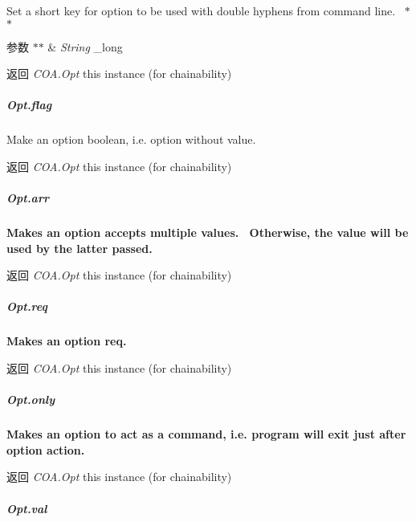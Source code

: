Set a short key for option to be used with double hyphens from command line.~\newline
 $\ast$$\ast$
\begin{DoxyParams}{参数}
{\em $\ast$$\ast$} & {\itshape String} {\ttfamily \+\_\+long}~\newline
 {\bfseries }\\
\hline
\end{DoxyParams}
\begin{DoxyReturn}{返回}
{\bfseries } {\itshape C\+O\+A.\+Opt} {\ttfamily this} instance (for chainability)
\end{DoxyReturn}
\subparagraph*{Opt.\+flag}

Make an option boolean, i.\+e. option without value.~\newline
 {\bfseries \begin{DoxyReturn}{返回}
{\itshape C\+O\+A.\+Opt} {\ttfamily this} instance (for chainability)
\end{DoxyReturn}
\subparagraph*{Opt.\+arr}}

{\bfseries  Makes an option accepts multiple values.~\newline
 Otherwise, the value will be used by the latter passed.~\newline
 {\bfseries \begin{DoxyReturn}{返回}
{\itshape C\+O\+A.\+Opt} {\ttfamily this} instance (for chainability)
\end{DoxyReturn}
\subparagraph*{Opt.\+req}}}

{\bfseries {\bfseries  Makes an option req.~\newline
 {\bfseries \begin{DoxyReturn}{返回}
{\itshape C\+O\+A.\+Opt} {\ttfamily this} instance (for chainability)
\end{DoxyReturn}
\subparagraph*{Opt.\+only}}}}

{\bfseries {\bfseries {\bfseries  Makes an option to act as a command, i.\+e. program will exit just after option action.~\newline
 {\bfseries \begin{DoxyReturn}{返回}
{\itshape C\+O\+A.\+Opt} {\ttfamily this} instance (for chainability)
\end{DoxyReturn}
\subparagraph*{Opt.\+val}}}}}

